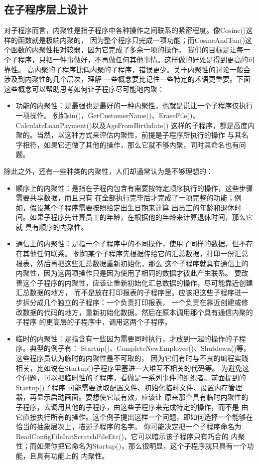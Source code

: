 \documentclass{article}
\begin{document}
\subsection{在子程序层上设计}
对子程序而言，内聚性是指子程序中各种操作之间联系的紧密程度。像Cosine()这样的函数就是极端内聚的，
因为整个程序只完成一项功能；而CosineAndTan()这个函数的内聚性相对较弱，因为它完成了多余一项的操作。
我们的目标是让每一个子程序，只把一件事做好，不再做任何其他事情。这样做的好处是得到更高的可靠性。
高内聚的子程序比低内聚的子程序，错误更少。关于内聚性的讨论一般会涉及到内聚性的几个层次，理解
一些概念要比记住一些特定的术语更重要。下面这些概念可以帮助思考如何让子程序尽可能地内聚：
\begin{itemize}
    \item 功能的内聚性：是最强也是最好的一种内聚性，也就是说让一个子程序仅执行一项操作。
    例如sin()，GetCustomerName()、EraseFile()、CalculateLoanPayment()以及AgeFromBirthdate()
    这样的子程序，都是高度内聚的。当然，以这种方式来评估内聚性，前提是子程序所执行的操作
    与其名字相符，如果它还做了其他的操作，那么它就不够内聚，同时其命名也有问题。
\end{itemize}
除此之外，还有一些种类的内聚性，人们却通常认为是不够理想的：
\begin{itemize}
    \item 顺序上的内聚性：是指在子程内包含有需要按特定顺序执行的操作，这些步骤需要共享数据，而且只有
    在全部执行完毕后才完成了一项完整的功能；例如，假设某个子程序需要按照给定出生日期来计算
    出员工的年龄和退休时间。如果子程序先计算员工的年龄，在根据他的年龄来计算退休时间，那么它就
    具有顺序的内聚性。
    \item 通信上的内聚性：是指一个子程序中的不同操作，使用了同样的数据，但不存在其他任何联系。
    例如某个子程序先根据传给它的汇总数据，打印一份汇总报表，然后再把这些汇总数据重新初始化，那么
    这个子程序就具有通信上的内聚性，因为这两项操作只是因为使用了相同的数据才彼此产生联系。
    要改善这个子程序的内聚性，应该让重新初始化汇总数据的操作，尽可能靠近创建汇总数据的地方，
    而不是放在打印报表的子程序里。应该把这些子程序进一步拆分成几个独立的子程序：一个负责打印报表，
    一个负责在靠近创建或修改数据的代码的地方，重新初始化数据。然后在原本调用那个具有通信内聚的子程序
    的更高层的子程序中，调用这两个子程序。
    \item 临时的内聚性：是指含有一些因为需要同时执行，才放到一起的操作的子程序。典型的例子有：
    Startup()、CompleteNewEmployee()、Shutdown()等。这些程序员认为临时的内聚性是不可取的，
    因为它们有时与不良的编程实践相关，比如说在Startup()子程序里塞进一大堆互不相关的代码等。
    为避免这个问题，可以把临时性的子程序，看做是一系列事件的组织者。前面提到的Startup()子程序
    可能需要读取配置文件、初始化临时文件、设置内存管理器，再显示启动画面。要想使它最有效，应该让
    原来那个具有临时内聚性的子程序，去调用其他的子程序，由这些子程序来完成特定的操作，而不是
    由它直接执行所有的操作。这个例子提出这样一个问题，即如何选择一个能够在恰当的抽象层次上，描述子程序的名字。
    你可能决定把一个子程序命名为ReadConfigFileInitScratchFileEtc()，它可以暗示该子程序只有巧合的
    内聚性；而如果你把它命名为Startup()，那么很明显，这个子程序就只具有一个功能，且具有功能上的
    内聚性。
\end{itemize}
\end{document}

